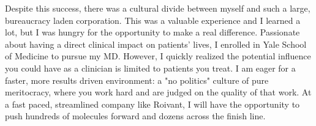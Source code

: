 \documentclass[11pt, letterpaper]{awesome-cv}
\begin{document}
\begin{cvletter}
Despite this success, there was a cultural divide between myself and such a large, bureaucracy laden corporation. This was a valuable experience and I learned a lot, but I was hungry for the opportunity to make a real difference. Passionate about having a direct clinical impact on patients' lives, I enrolled in Yale School of Medicine to pursue my MD. However, I quickly realized the potential influence you could have as a clinician is limited to patients you treat. I am eager for a faster, more results driven environment: a "no politics" culture of pure meritocracy, where you work hard and are judged on the quality of that work.  At a fast paced, streamlined company like Roivant, I will have the opportunity to push hundreds of molecules forward and dozens across the finish line.

\end{cvletter}


\makeletterclosing
\end{document}
